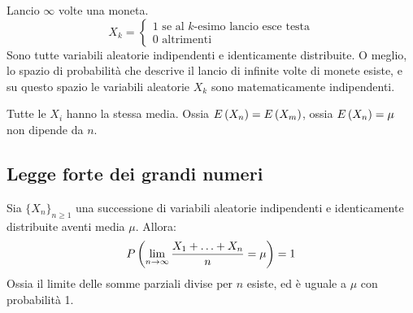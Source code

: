 \begin{exmp}
Lancio $\infty$ volte una moneta.
\[
X_k = 
\begin{cases}
1 \text{ se al $k$-esimo lancio esce testa} \\
0 \text{ altrimenti}
\end{cases}
\]
Sono tutte variabili aleatorie indipendenti e identicamente distribuite. O meglio, lo spazio di probabilit\`a che descrive il lancio di infinite volte di monete esiste, e su questo spazio le variabili aleatorie $X_k$ sono matematicamente indipendenti.

Tutte le $X_i$ hanno la stessa media. Ossia $E \left( X_n \right) = E \left( X_m \right)$, ossia $E \left( X_n \right) = \mu$ non dipende da $n$.
\end{exmp}

\subsection{Legge forte dei grandi numeri}

\begin{theorem}
Sia $\{X_n\}_{n \ge 1}$ una successione di variabili aleatorie indipendenti e identicamente distribuite aventi media $\mu$. Allora:
\[
P \left( { \lim_{n \to \infty} \frac{X_1 + \ldots + X_n}{n} = \mu} \right) = 1
\]
Ossia il limite delle somme parziali divise per $n$ esiste, ed \`e uguale a $\mu$ con probabilit\`a 1.
\end{theorem}

